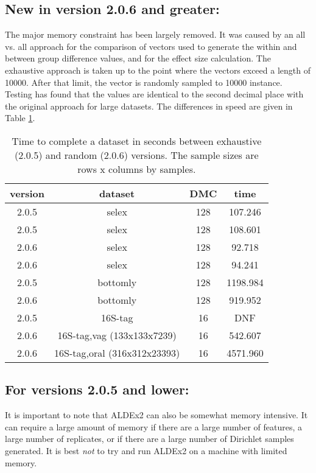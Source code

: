 \documentclass[11pt]{amsart}
\begin{document}
\subsection{New in version 2.0.6 and greater:} The major memory constraint has been largely removed. It was caused by an all vs. all approach for the comparison of vectors used to generate the within and between group difference values, and for the effect size calculation. The exhaustive approach is taken up to the point where the vectors exceed a length of 10000. After that limit, the vector is randomly sampled to 10000 instance. Testing has found that the values are identical to the second decimal place with the original approach for large datasets. The differences in speed are given in Table \ref{exvsra}.
\begin{table}
\caption{Time to complete a dataset in seconds between exhaustive (2.0.5) and random (2.0.6) versions. The sample sizes are rows x columns by samples.}
\begin{tabular}{cccc}

version & dataset & DMC  &  time\\\hline
2.0.5  &  selex  &  128  &  107.246\\
2.0.5  &  selex  &  128  &  108.601\\
2.0.6  &  selex  &  128  &  92.718\\
2.0.6  &  selex  &  128  &  94.241\\
2.0.5  &  bottomly  &  128  &  1198.984   \\
2.0.6  &  bottomly  &  128  &  919.952\\
2.0.5  &  16S-tag  &  16  &  DNF\\
2.0.6  &  16S-tag,vag (133x133x7239)  &  16  &  542.607\\
2.0.6  &  16S-tag,oral (316x312x23393)  &  16  &  4571.960\\
\end{tabular}
\label{exvsra}

\end{table}

\subsection{For versions 2.0.5 and lower:} It is important to note that ALDEx2 can also be somewhat memory intensive. It can require a large amount of memory if there are a large number of features, a large number of replicates, or if there are a large number of Dirichlet samples generated. It is best \emph{not} to try and run ALDEx2 on a machine with limited memory. 
\end{document}
